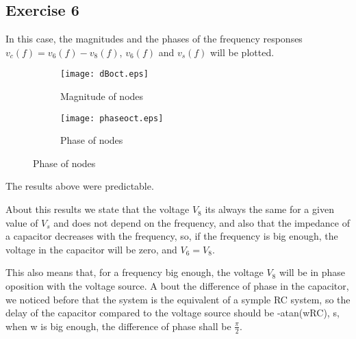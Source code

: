 \subsection{Exercise 6} \label{sec:Ex6Theo}

In this case, the magnitudes and the phases of the frequency responses $v_c(f)=v_6(f)-v_8(f)$, $v_6(f)$ and $v_s(f)$ will be plotted.

 \begin{figure}[H]
 \footnotesize
\begin{subfigure}{.49\linewidth}
 \footnotesize
  \centering
  \texttt{[image: dBoct.eps]}
   \footnotesize
\caption{Magnitude of nodes}
\label{fig:final_magnitude}
\end{subfigure}
\begin{subfigure}{.49\linewidth}
  \centering
  \texttt{[image: phaseoct.eps]}  
\caption{Phase of nodes}
\label{fig:final_phase}
\end{subfigure}
 \end{figure}
 The results above were predictable.
 \par
 About this results we state that the voltage $V_8$ its always the same for a given value of $V_s$ and does not depend on the frequency, and also that the impedance of a capacitor decreases with the frequency, so, if the frequency is big enough, the voltage in the capacitor will be zero, and $V_6=V_8$.
 \par
 This also means that, for a frequency big enough, the voltage $V_8$ will be in phase oposition with the voltage source. A bout the difference of phase in the capacitor, we noticed before that the system is the equivalent of a symple RC system, so the delay of the capacitor compared to the voltage source should be -atan(wRC), s, when w is big enough, the difference of phase shall be $\frac{\pi}{2}$.



